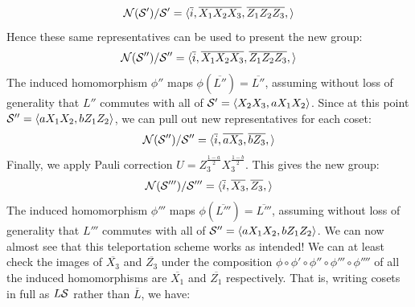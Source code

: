 \begin{example}
    \begin{equation}
        \mathcal{N}(\mathcal{S}')/\mathcal{S}' = \langle
        \overline{i},
        \overline{X_1 X_2 X_3}, \overline{Z_1 Z_2 Z_3},
        \rangle
    \end{equation}
    Hence these same representatives can be used to present the new group:
    \begin{equation}
        \mathcal{N}(\mathcal{S}'')/\mathcal{S}'' = \langle
        \overline{i},
        \overline{X_1 X_2 X_3}, \overline{Z_1 Z_2 Z_3},
        \rangle
    \end{equation}
    The induced homomorphism $\phi''$ maps $\phi(\overline{L''}) = \overline{L''}$, assuming without loss of generality that $L''$ commutes with all of $\mathcal{S}' = \langle X_2 X_3, a X_1 X_2 \rangle$.
    Since at this point $\mathcal{S}'' = \langle a X_1 X_2, b Z_1 Z_2 \rangle$, we can pull out new representatives for each coset:
    \begin{equation}
        \mathcal{N}(\mathcal{S}'')/\mathcal{S}'' = \langle
        \overline{i},
        \overline{a X_3}, \overline{b Z_3},
        \rangle
    \end{equation}
    Finally, we apply Pauli correction $U = Z_3^{\frac{1 - a}{2}} X_3^{\frac{1 - b}{2}}$.
    This gives the new group:
    \begin{equation}
        \mathcal{N}(\mathcal{S}''')/\mathcal{S}''' = \langle
        \overline{i},
        \overline{X_3}, \overline{Z_3},
        \rangle
    \end{equation}
    The induced homomorphism $\phi'''$ maps $\phi(\overline{L'''}) = \overline{L'''}$, assuming without loss of generality that $L'''$ commutes with all of $\mathcal{S}'' = \langle a X_1 X_2, b Z_1 Z_2 \rangle$.
    We can now almost see that this teleportation scheme works as intended!
    We can at least check the images of $\overline{X_3}$ and $\overline{Z_3}$ under the composition $\phi \circ \phi' \circ \phi'' \circ \phi''' \circ \phi''''$ of all the induced homomorphisms are $\overline{X_1}$ and $\overline{Z_1}$ respectively.
    That is, writing cosets in full as $L\mathcal{S}$ rather than $\overline{L}$, we have:

\end{example}
